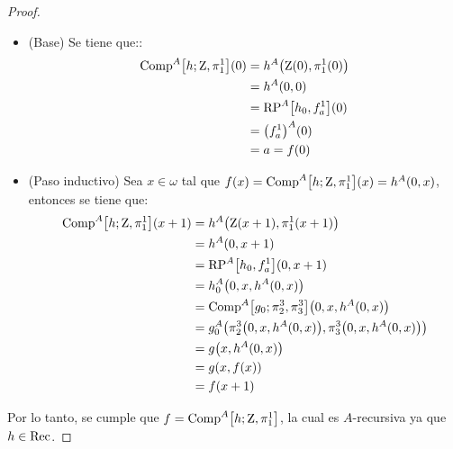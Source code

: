 \begin{proof}
	\begin{itemize}
		\item (Base) Se tiene que::
		\begin{align*}
			\COMPOSICION^{A}\bra*{h;\CERO,\PROYECCION{1}{1}}\pa*{0} &= h^{A}\pa*{\CERO\pa*{0},\PROYECCION{1}{1}\pa*{0}}\\
			&= h^{A}\pa*{0, 0} \\
			&=\RECURSION^{A}\bra*{h_{0}, f^{1}_{a}}\pa*{0}\\
			&=\pa*{f_{a}^{1}}^{A}\pa*{0}\\
			&= a = f\pa*{0}
		\end{align*}
		\item (Paso inductivo) Sea $x\in\omega$ tal que $f\pa*{x} = \COMPOSICION^{A}\bra*{h;\CERO,\PROYECCION{1}{1}}\pa*{x} = h^{A}\pa*{0, x}$, entonces se tiene que:
		\begin{align*}
			\COMPOSICION^{A}\bra*{h;\CERO,\PROYECCION{1}{1}}\pa*{x + 1} &= h^{A}\pa*{\CERO\pa*{x + 1},\PROYECCION{1}{1}\pa*{x + 1}}\\
			&= h^{A}\pa*{0, x + 1}\\
			&=\RECURSION^{A}\bra*{h_{0}, f_{a}^{1}}\pa*{0, x + 1}\\
			&= h_{0}^{A}\pa*{0, x, h^{A}\pa*{0, x}}\\
			&=\COMPOSICION^{A}\bra*{g_{0};\PROYECCION{3}{2},\PROYECCION{3}{3}}\pa*{0, x, h^{A}\pa*{0, x}}\\
			&= g_{0}^{A}\pa*{\PROYECCION{3}{2}\pa*{0, x, h^{A}\pa*{0, x}},\PROYECCION{3}{3}\pa*{0, x, h^{A}\pa*{0, x}}}\\
			&= g\pa*{x, h^{A}\pa*{0, x}}\\
			&= g\pa*{x, f\pa*{x}}\\
			&= f\pa*{x + 1}
		\end{align*}
	\end{itemize}

	Por lo tanto, se cumple que $f = \COMPOSICION^{A}\bra*{h;\CERO,\PROYECCION{1}{1}}$, la cual es $A$-recursiva ya que $h\in\mathrm{Rec}$.
\end{proof}

